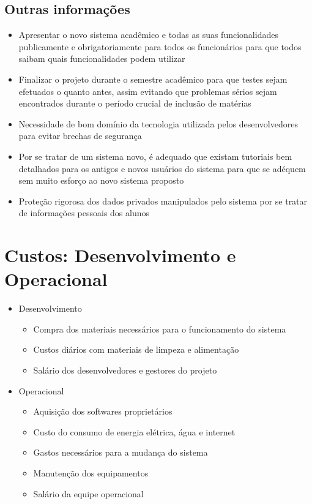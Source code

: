         \subsection{Outras informações}
        
            \begin{itemize}
                \item Apresentar o novo sistema acadêmico e todas as suas funcionalidades publicamente e obrigatoriamente para todos os funcionários para que todos saibam quais funcionalidades podem utilizar
                \item Finalizar o projeto durante o semestre acadêmico para que testes sejam efetuados o quanto antes, assim evitando que problemas sérios sejam encontrados durante o período crucial de inclusão de matérias
                \item Necessidade de bom domínio da tecnologia utilizada pelos desenvolvedores para evitar brechas de segurança
                \item Por se tratar de um sistema novo, é adequado que existam tutoriais bem detalhados para os antigos e novos usuários do sistema para que se adéquem sem muito esforço ao novo sistema proposto
                \item Proteção rigorosa dos dados privados manipulados pelo sistema por se tratar de informações pessoais dos alunos
            \end{itemize}

    
    \section{Custos: Desenvolvimento e Operacional} %
        \begin{itemize}
            \item Desenvolvimento
                \begin{itemize}
                    \item Compra dos materiais necessários para o funcionamento do sistema
                    \item Custos diários com materiais de limpeza e alimentação
                    \item Salário dos desenvolvedores e gestores do projeto
                \end{itemize}
            \item Operacional
                \begin{itemize}
                    \item Aquisição dos softwares proprietários
                    \item Custo do consumo de energia elétrica, água e internet
                    \item Gastos necessários para a mudança do sistema
                    \item Manutenção dos equipamentos
                    \item Salário da equipe operacional %
                \end{itemize}
        \end{itemize}
        
